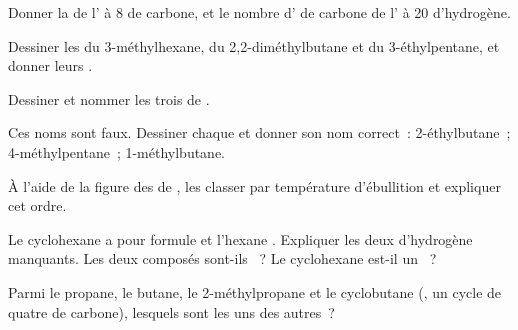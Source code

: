 \begin{exercise}[$\star$]\label{exo:g11:organic-skeletons:5}
Donner la  de l' à 8  de carbone, et le nombre
d' de carbone de l' à 20  d'hydrogène.
\end{exercise}

\begin{exercise}[$\star\star$]\label{exo:g11:organic-skeletons:6}
Dessiner les  du 3-méthylhexane, du
2,2-diméthylbutane et du 3-éthylpentane, et donner leurs .
\end{exercise}

\begin{exercise}[$\star\star$]\label{exo:g11:organic-skeletons:7}
Dessiner et nommer les trois  de .
\end{exercise}

\begin{exercise}[$\star\star$]\label{exo:g11:organic-skeletons:8}
Ces noms sont faux. Dessiner chaque  et donner son nom
correct~: 2-éthylbutane~; 4-méthylpentane~; 1-méthylbutane.
\end{exercise}

\begin{exercise}[$\star\star$]\label{exo:g11:organic-skeletons:9}
À l'aide de la figure des  de , les classer par
température d'ébullition et expliquer cet ordre.
\end{exercise}

\begin{exercise}[$\star\star$]\label{exo:g11:organic-skeletons:10}
Le cyclohexane a pour formule  et l'hexane .
Expliquer les deux  d'hydrogène manquants. Les deux composés
sont-ils ~? Le cyclohexane est-il un ~?
\end{exercise}

\begin{exercise}[$\star\star$]\label{exo:g11:organic-skeletons:11}
Parmi le propane, le butane, le 2-méthylpropane et le cyclobutane
(, un cycle de quatre  de carbone), lesquels sont 
les uns des autres~?
\end{exercise}


